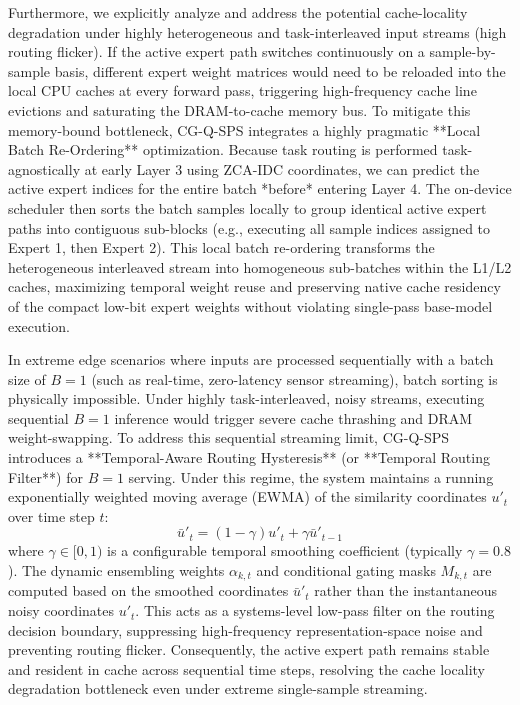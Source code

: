 Furthermore, we explicitly analyze and address the potential cache-locality degradation under highly heterogeneous and task-interleaved input streams (high routing flicker). If the active expert path switches continuously on a sample-by-sample basis, different expert weight matrices would need to be reloaded into the local CPU caches at every forward pass, triggering high-frequency cache line evictions and saturating the DRAM-to-cache memory bus. To mitigate this memory-bound bottleneck, CG-Q-SPS integrates a highly pragmatic **Local Batch Re-Ordering** optimization. Because task routing is performed task-agnostically at early Layer 3 using ZCA-IDC coordinates, we can predict the active expert indices for the entire batch *before* entering Layer 4. The on-device scheduler then sorts the batch samples locally to group identical active expert paths into contiguous sub-blocks (e.g., executing all sample indices assigned to Expert 1, then Expert 2). This local batch re-ordering transforms the heterogeneous interleaved stream into homogeneous sub-batches within the L1/L2 caches, maximizing temporal weight reuse and preserving native cache residency of the compact low-bit expert weights without violating single-pass base-model execution.

In extreme edge scenarios where inputs are processed sequentially with a batch size of $B=1$ (such as real-time, zero-latency sensor streaming), batch sorting is physically impossible. Under highly task-interleaved, noisy streams, executing sequential $B=1$ inference would trigger severe cache thrashing and DRAM weight-swapping. To address this sequential streaming limit, CG-Q-SPS introduces a **Temporal-Aware Routing Hysteresis** (or **Temporal Routing Filter**) for $B=1$ serving. Under this regime, the system maintains a running exponentially weighted moving average (EWMA) of the similarity coordinates $u'_t$ over time step $t$:
\begin{equation}
  \bar{u}'_t = (1 - \gamma) u'_t + \gamma \bar{u}'_{t-1}
\end{equation}
where $\gamma \in [0, 1)$ is a configurable temporal smoothing coefficient (typically $\gamma = 0.8$). The dynamic ensembling weights $\alpha_{k, t}$ and conditional gating masks $M_{k, t}$ are computed based on the smoothed coordinates $\bar{u}'_t$ rather than the instantaneous noisy coordinates $u'_t$. This acts as a systems-level low-pass filter on the routing decision boundary, suppressing high-frequency representation-space noise and preventing routing flicker. Consequently, the active expert path remains stable and resident in cache across sequential time steps, resolving the cache locality degradation bottleneck even under extreme single-sample streaming.

